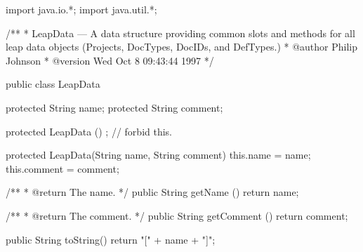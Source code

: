 import java.io.*;
import java.util.*;

/**
 * LeapData --- A data structure providing common slots and methods for all leap data objects (Projects, DocTypes, DocIDs, and DefTypes.)
 * @author         Philip Johnson
 * @version        Wed Oct  8 09:43:44 1997
 */

public class LeapData {
  protected String name;
  protected String comment;

  protected LeapData () {};  // forbid this.

  protected LeapData(String name, String comment) {
    this.name = name;
    this.comment = comment;
  }

  /**
   * @return The name.
   */
  public String getName () {
    return name;
  }

  /**
   * @return The comment.
   */
  public String getComment () {
    return comment;
  }

  public String toString() {
    return "[" + name + "]";
  }
}


                                                                                                                                                                                                                                                                                                                                                                                                                                                                                                                                                                                                                                                                                                                                                                                                                                                                                                                                                        %



